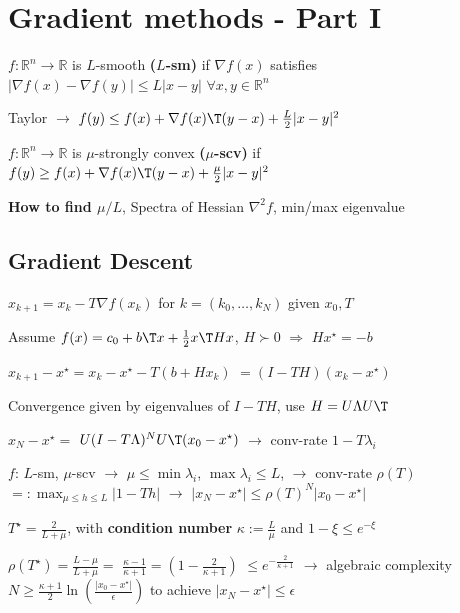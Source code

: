 
\section{Gradient methods - Part I}

\begin{definition}[smoothness]
	$f : \mathbb{R}^{n}\rightarrow \mathbb{R}$
	is $L$-smooth \textbf{($L$-sm)} if
	$\nabla f(x)$
	satisfies
	$|\nabla f(x)-\nabla f(y)|\le L|x-y|$
	$\forall x,y \in \mathbb{R}^{n}$
\end{definition}

Taylor
$\rightarrow$
$f(y)\le f(x)+\nabla f(x)\T (y-x) +\frac{L}{2}|x-y|^2$

\begin{definition}
	$f : \mathbb{R}^{n}\rightarrow \mathbb{R}$
	is $\mu$-strongly convex \textbf{($\mu$-scv)} if
	$f(y)\ge f(x)+\nabla f(x)\T(y-x)+\frac{\mu}{2}|x-y|^2$
\end{definition}

\textbf{How to find $\mu/L$},
Spectra of Hessian $\nabla^2f$, min/max eigenvalue

\subsection{Gradient Descent}

$x_{k+1}=x_k-T\nabla f(x_k)$
for
$k = (k_0,\dots,k_N)$
given
$x_0,T$


Assume
$f(x)=c_0+b\T x+\frac{1}{2}x\T Hx$,
$H\succ0$
$\Rightarrow$
$Hx^\star =-b$

$x_{k+1}-x^\star=x_k-x^\star-T(b+Hx_k)$
$=(I-TH)(x_k-x^\star)$

Convergence given by eigenvalues of $I-TH$,
use $H=U\Lambda U\T$

$x_{N}-x^\star=$
$U(I-T\Lambda)^N U\T(x_0-x^\star)$
$\rightarrow$
conv-rate $1-T\lambda_i$

$f$: $L$-sm, $\mu$-scv
$\rightarrow$
$\mu\le\operatorname{min}\lambda_i$,
$\operatorname{max}\lambda_i\le L$,
$\rightarrow$
conv-rate
$\rho(T)$
$=:\operatorname{max}_{\mu\le h\le L}|1-Th|$
$\rightarrow$
$|x_{N}-x^\star|\le\rho(T)^N|x_{0}-x^\star|$

$T^\star=\frac{2}{L+\mu}$,
with \textbf{condition number}
$\kappa:=\frac{L}{\mu}$
and
$1-\xi\le e^{-\xi}$

$\rho(T^\star)=\frac{L-\mu}{L+\mu}=$
$\frac{\kappa-1}{\kappa+1}=(1-\frac{2}{\kappa+1})$
$\le e^{-\frac{2}{\kappa+1}}$
$\rightarrow$
algebraic complexity
$N\ge\frac{\kappa+1}{2}\operatorname{ln}(\frac{|x_{0}-x^\star|}{\epsilon})$
to achieve
$|x_{N}-x^\star|\le\epsilon$

